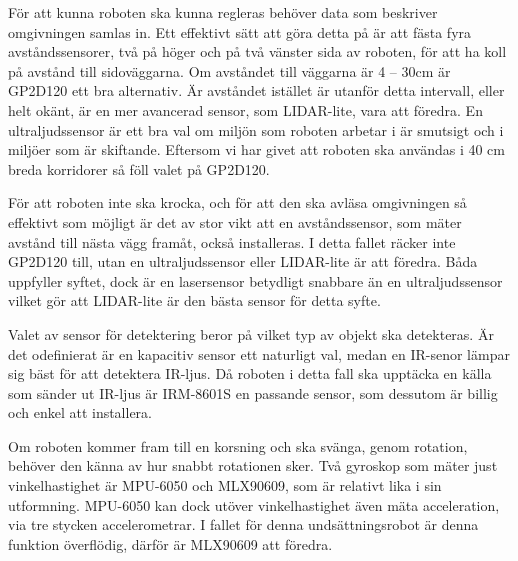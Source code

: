 \documentclass[11pt]{article}
\begin{document}
\begin{flushleft}
För att kunna roboten ska kunna regleras behöver data som beskriver omgivningen samlas in. Ett effektivt sätt att göra detta på är att fästa fyra avståndssensorer, två på höger och på två vänster sida av roboten, för att ha koll på avstånd till sidoväggarna. Om avståndet till väggarna är 4 – 30cm är GP2D120 ett bra alternativ. Är avståndet istället är utanför detta intervall, eller helt okänt, är en mer avancerad sensor, som LIDAR-lite, vara att föredra. En ultraljudssensor är ett bra val om miljön som roboten arbetar i är smutsigt och i miljöer som är skiftande. Eftersom vi har givet att roboten ska användas i 40 cm breda korridorer så föll valet på GP2D120.

För att roboten inte ska krocka, och för att den ska avläsa omgivningen så effektivt som möjligt är det av stor vikt att en avståndssensor, som mäter avstånd till nästa vägg framåt, också installeras. I detta fallet räcker inte GP2D120 till, utan en ultraljudssensor eller LIDAR-lite är att föredra. Båda uppfyller syftet, dock är en lasersensor betydligt snabbare än en ultraljudssensor vilket gör att LIDAR-lite är den bästa sensor för detta syfte. 

Valet av sensor för detektering beror på vilket typ av objekt ska detekteras. Är det odefinierat är en kapacitiv sensor ett naturligt val, medan en IR-senor lämpar sig bäst för att detektera IR-ljus. Då roboten i detta fall ska upptäcka en källa som sänder ut IR-ljus är IRM-8601S en passande sensor, som dessutom är billig och enkel att installera.

Om roboten kommer fram till en korsning och ska svänga, genom rotation, behöver den känna av hur snabbt rotationen sker. Två gyroskop som mäter just vinkelhastighet är MPU-6050 och MLX90609, som är relativt lika i sin utformning. MPU-6050 kan dock utöver vinkelhastighet även mäta acceleration, via tre stycken accelerometrar. I fallet för denna undsättningsrobot är denna funktion överflödig, därför är MLX90609 att föredra. 


\pagebreak
{}




\pagebreak
\appendix

\end{flushleft}



\end{document}
